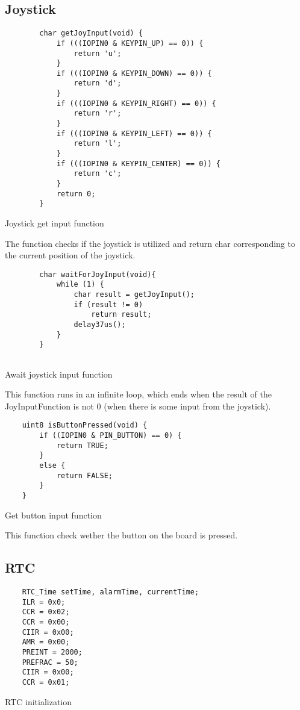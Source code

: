 \documentclass[10pt]{article}
\begin{document}
\subsection{Joystick}

\begin{program}
	\begin{lstlisting}
        char getJoyInput(void) {
            if (((IOPIN0 & KEYPIN_UP) == 0)) {
                return 'u';
            }
            if (((IOPIN0 & KEYPIN_DOWN) == 0)) {
                return 'd';
            }
            if (((IOPIN0 & KEYPIN_RIGHT) == 0)) {
                return 'r';
            }
            if (((IOPIN0 & KEYPIN_LEFT) == 0)) {
                return 'l';
            }
            if (((IOPIN0 & KEYPIN_CENTER) == 0)) {
                return 'c';
            }
            return 0;
        }
	\end{lstlisting}
	\caption{Joystick get input function}
\end{program}
The function checks if the joystick is utilized and return char corresponding to the current position of the joystick.

\begin{program}[H]
	\begin{lstlisting}
        char waitForJoyInput(void){
            while (1) {
                char result = getJoyInput();
                if (result != 0)
                    return result;
                delay37us();
            }
        }
                
	\end{lstlisting}
	\caption{Await joystick input function}
\end{program}
This function runs in an infinite loop, which ends when the result of the JoyInputFunction is not 0 (when there is some input from the joystick).

\begin{program}    
	\begin{lstlisting}
    uint8 isButtonPressed(void) {
        if ((IOPIN0 & PIN_BUTTON) == 0) {
            return TRUE;
        }
        else {
            return FALSE;
        }
    }
	\end{lstlisting}
	\caption{Get button input function}
\end{program}      
This function check wether the button on the board is pressed.

\subsection{RTC}
\begin{program}[H]
	\begin{lstlisting}
	RTC_Time setTime, alarmTime, currentTime;
	ILR = 0x0; 
	CCR = 0x02; 
	CCR = 0x00;
	CIIR = 0x00;
	AMR = 0x00;  
	PREINT = 2000;
	PREFRAC = 50;
	CIIR = 0x00;
   	CCR = 0x01;
	\end{lstlisting}
	\caption{RTC initialization}
\end{program}
\end{document}
